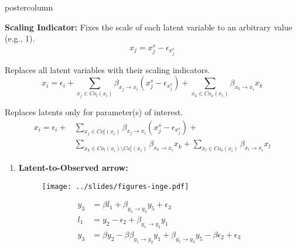 \documentclass{beamer}
\begin{document}
\begin{frame}
\begin{columns}
\begin{column}{.33\textwidth}
\begin{beamercolorbox}[center]{postercolumn}
\begin{minipage}{.98\textwidth}
{\begin{myblock}{}
		\vspace{0.3em}
		\justifying \textbf{Scaling Indicator:} Fixes the scale of each latent variable to an arbitrary value (e.g., 1).
			$$ x_j = x_j^s - \epsilon_{x_j^s} $$

		\vspace{0.3em}
		\justifying \textbf{} Replaces all latent variables with their scaling indicators.
 			$$ x_i = \epsilon_i + \sum_{x_j \in Co_l(x_i)} \beta_{x_j \rightarrow x_i} (x_j^s - \epsilon_{x_j^s}) + \sum_{x_k \in Co_o(x_i)} \beta_{x_k \rightarrow x_i} x_k $$

		\vspace{0.3em}
		\justifying \textbf{} Replaces latents only for parameter(s) of interest.
			\begin{equation*}
			\begin{split}
				x_i = \epsilon_i + & \sum_{x_j \in Co_l^i(x_i)} \beta_{x_j \rightarrow x_i} (x_j^s - \epsilon_{x_j^s}) +  \\
						   & \sum_{x_k \in Co_l(x_i) \setminus Co_l^i(x_i)} \beta_{x_k \rightarrow x_i} x_k + \sum_{x_l \in Co_o(x_i)} \beta_{x_l \rightarrow x_i} x_l
			\end{split}
			\end{equation*}
	\end{myblock} \vfill
	\begin{myblock}{}
		\begin{enumerate}
			\item \textbf{Latent-to-Observed arrow:}
				\begin{figure}
					\centering
					\texttt{[image: ../slides/figures-inge.pdf]}
					\label{fig:l2o_lat_obs}
				\end{figure}
				\begin{equation*}
					\begin{split}
						y_3 &= \beta l_1 + \beta_{y_5 \to y_3} y_5 + \epsilon_3 \\
						l_1 &= y_2 - \epsilon_{2} + \beta_{y_1 \to y_2} y_1 \\
						y_3 &= \beta y_2 - \beta \beta_{y_1 \to y_2} y_1 + \beta_{y_5 \to y_3} y_5 - \beta \epsilon_2 + \epsilon_3\\
					\end{split}
				\end{equation*}
		\end{enumerate}
	\end{myblock}\vfill
		}\end{minipage}\end{beamercolorbox}
	\end{column}


\end{columns}
\end{frame}
\end{document}
